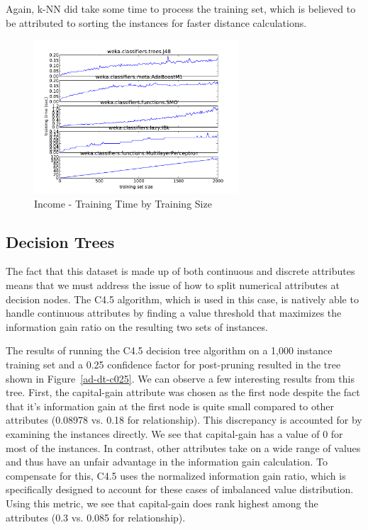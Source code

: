 \documentclass{sig-alternate}
\begin{document}
Again, k-NN did take some time to process the training set, which is believed to be attributed to sorting the instances for faster distance calculations.

\begin{figure}[!htbp]
    \centering
    \includegraphics[width=3in]{data/adult/learning-curve-10to2000/runtime.pdf}
    \caption{Income - Training Time by Training Size \label{ad-runtime}}
\end{figure} 


\subsection{Decision Trees}

The fact that this dataset is made up of both continuous and discrete attributes means that we must address the issue of how to split numerical attributes at decision nodes. The C4.5 algorithm, which is used in this case, is natively able to handle continuous attributes by finding a value threshold that maximizes the information gain ratio on the resulting two sets of instances.

The results of running the C4.5 decision tree algorithm on a 1,000 instance training set and a 0.25 confidence factor for post-pruning resulted in the tree shown in Figure~\ref{ad-dt-c025}. We can observe a few interesting results from this tree. First, the capital-gain attribute was chosen as the first node despite the fact that it's information gain at the first node is quite small compared to other attributes (0.08978 vs. 0.18 for relationship). This discrepancy is accounted for by examining the instances directly. We see that capital-gain has a value of 0 for most of the instances. In contrast, other attributes take on a wide range of values and thus have an unfair advantage in the information gain calculation. To compensate for this, C4.5 uses the normalized information gain ratio, which is specifically designed to account for these cases of imbalanced value distribution. Using this metric, we see that capital-gain does rank highest among the attributes (0.3 vs. 0.085 for relationship).
\end{document}

